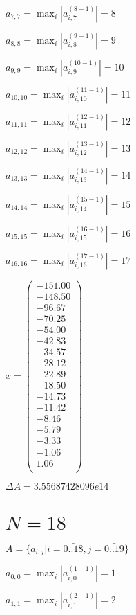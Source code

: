 \documentclass[a4paper,12pt]{article}
\begin{document}
$a _{ 7, 7 } =  \max _i |a _{ i, 7 } ^{ (8 - 1) } | = 8$

$a _{ 8, 8 } =  \max _i |a _{ i, 8 } ^{ (9 - 1) } | = 9$

$a _{ 9, 9 } =  \max _i |a _{ i, 9 } ^{ (10 - 1) } | = 10$

$a _{ 10, 10 } =  \max _i |a _{ i, 10 } ^{ (11 - 1) } | = 11$

$a _{ 11, 11 } =  \max _i |a _{ i, 11 } ^{ (12 - 1) } | = 12$

$a _{ 12, 12 } =  \max _i |a _{ i, 12 } ^{ (13 - 1) } | = 13$

$a _{ 13, 13 } =  \max _i |a _{ i, 13 } ^{ (14 - 1) } | = 14$

$a _{ 14, 14 } =  \max _i |a _{ i, 14 } ^{ (15 - 1) } | = 15$

$a _{ 15, 15 } =  \max _i |a _{ i, 15 } ^{ (16 - 1) } | = 16$

$a _{ 16, 16 } =  \max _i |a _{ i, 16 } ^{ (17 - 1) } | = 17$

$\bar { x } = \begin{pmatrix}
-151.00 \\
-148.50 \\
-96.67 \\
-70.25 \\
-54.00 \\
-42.83 \\
-34.57 \\
-28.12 \\
-22.89 \\
-18.50 \\
-14.73 \\
-11.42 \\
-8.46 \\
-5.79 \\
-3.33 \\
-1.06 \\
1.06 \\
\end{pmatrix}
$

$\Delta A = 3.55687428096e14$



\section{ $N = 18$ }
$A = \{ a _{ i, j } | i = \bar { 0..18 }, j = \bar { 0..19 } \}$

$a _{ 0, 0 } =  \max _i |a _{ i, 0 } ^{ (1 - 1) } | = 1$

$a _{ 1, 1 } =  \max _i |a _{ i, 1 } ^{ (2 - 1) } | = 2$
\end{document}
